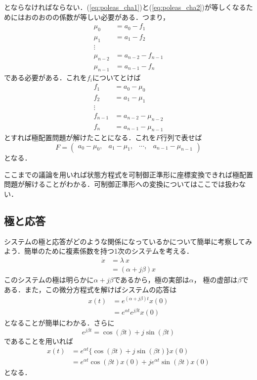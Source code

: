 とならなければならない．(\ref{eq:poleas_cha1})と(\ref{eq:poleas_cha2})が等しくなるためにはおのおのの係数が等しい必要がある．つまり，
\begin{align}
 \mu_0 & = a_0-f_1
\nonumber\\
 \mu_{1} & = a_1-f_2
\nonumber\\
 \vdots
\\
 \mu_{n-2} & = a_{n-2}-f_{n-1}
\nonumber\\
　\mu_{n-1} & = a_{n-1}-f_n
\nonumber
\end{align}
である必要がある．これを$f_i$についてとけば
\begin{align}
 f_1 & = a_0-\mu_0
\nonumber\\
 f_2 & = a_1-\mu_{1}
\nonumber\\
 \vdots
\\
 f_{n-1} & = a_{n-2}-\mu_{n-2}
\nonumber\\
　f_n& = a_{n-1}-\mu_{n-1} 
\nonumber
\end{align}
とすれば極配置問題が解けたことになる．これを$F$行列で表せば
\begin{equation}
 {F} = \left(\begin{array}{cccc}
	          a_0-\mu_0, & a_1-\mu_1, & \cdots, & a_{n-1}-\mu_{n-1}
		 \end{array}\right)
\end{equation}
となる．

ここまでの議論を用いれば状態方程式を可制御正準形に座標変換できれば極配置問題が解けることがわかる．可制御正準形への変換についてはここでは扱わない．



\subsection{極と応答}
システムの極と応答がどのような関係になっているかについて簡単に考察してみ
よう．簡単のために複素係数を持つ1次のシステムを考える．
\begin{align}
 \dot{x} &= \lambda \ x \nonumber \\
         &= (\alpha + j \beta) x
\end{align}
このシステムの極は明らかに$\alpha + j\beta$であるから，極の実部は$\alpha$，
極の虚部は$\beta$である．また，この微分方程式を解けばシステムの応答は
\begin{align}
 x(t) &= e^{(\alpha + j \beta)t} x(0) \nonumber \\
      &= e^{\alpha t}e^{j \beta t} x(0)
\end{align}
となることが簡単にわかる．さらに
\begin{equation}
 e^{j \beta t} = \cos(\beta t) + j \sin(\beta t)
\end{equation}
であることを用いれば
\begin{align}
 x(t) &= e^{\alpha t} \{ \cos(\beta t) + j \sin(\beta t) \}x(0) \nonumber \\
      &= e^{\alpha t} \cos(\beta t) x(0) + j e^{\alpha t} \sin(\beta t)x(0)
\end{align}
となる．

